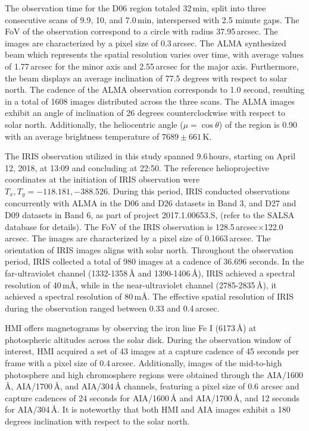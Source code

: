 \documentclass[a4paper,alpha-refs]{eSpectra}
\begin{document}
The observation time for the D06 region totaled 32\,min, split into three consecutive scans of 9.9, 10, and 7.0\,min, interspersed with 2.5 minute gaps. The FoV of the observation correspond to a circle with radius 37.95\,arcsec. The images are characterized by a pixel size of 0.3\,arcsec. The ALMA synthesized beam which represents the spatial resolution varies over time, with average values of 1.77\,arcsec for the minor axis and 2.55\,arcsec for the major axis. Furthermore, the  beam displays an average inclination of 77.5 degrees with respect to solar north. The cadence of the ALMA observation corresponds to 1.0 second, resulting in a total of 1608 images distributed across the three scans. The ALMA images exhibit an angle of inclination of 26 degrees counterclockwise with respect to solar north. Additionally,  the heliocentric angle ($\mu = \cos{\theta}$)  of the region is 0.90 with an average brightness temperature of $7689 \pm 661$\,K.  

The IRIS observation utilized in this study spanned 9.6\,hours, starting on April 12, 2018, at 13:09 and concluding at 22:50. The reference helioprojective coordinates at the initiation of IRIS observation were $T_x, T_y = -118.181, -388.526$. During this period, IRIS conducted observations concurrently with ALMA in the D06 and D26 datasets in Band 3, and D27 and D09 datasets in Band 6, as part of project 2017.1.00653.S, (refer to the SALSA database for details).  The FoV of the IRIS observation is 128.5\,arcsec$\times$122.0\,arcsec. The images are characterized by a pixel size of 0.1663\,arcsec. The orientation of IRIS images aligns with solar north. Throughout the observation period, IRIS collected a total of 980 images at a cadence of 36.696 seconds. In the far-ultraviolet channel (1332-1358\,Å and 1390-1406\,Å), IRIS achieved a spectral resolution of 40\,mÅ, while in the near-ultraviolet channel (2785-2835\,Å), it achieved a spectral resolution of 80\,mÅ. The effective spatial resolution of IRIS during the observation ranged between 0.33 and 0.4\,arcsec.


HMI offers magnetograms by observing the iron line Fe I (6173\,Å) at photospheric altitudes across the solar disk. During the observation window of interest, HMI acquired a set of 43 images at a capture cadence of 45 seconds per frame with a pixel size of 0.4\,arcsec. Additionally, images of the mid-to-high photosphere and high chromosphere regions were obtained through the AIA/1600\,Å, AIA/1700\,Å, and AIA/304\,Å channels, featuring a pixel size of 0.6 arcsec and capture cadences of 24 seconds for AIA/1600\,Å and AIA/1700\,Å, and 12 seconds for AIA/304\,Å. It is noteworthy that both HMI and AIA images exhibit a 180 degrees inclination with respect to the solar north.
\end{document}
